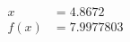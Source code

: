 \documentclass[preview]{standalone}
\begin{document}
\begin{align*}
x &= 4.8672\\f(x) &= 7.9977803
\end{align*}
\end{document}
